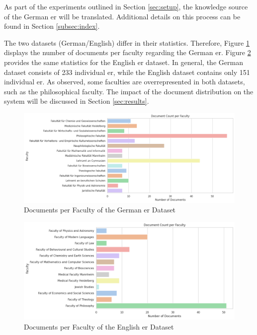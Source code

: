 As part of the experiments outlined in Section \ref{sec:setup}, the knowledge source of the German \gls{er} will be translated. Additional details on this process can be found in Section \ref{subsec:index}.

The two datasets (German/English) differ in their statistics. Therefore, Figure \ref{fig:er-german-stats} displays the number of documents per faculty regarding the German \gls{er}. Figure \ref{fig:er-english-stats} provides the same statistics for the English \gls{er} dataset. In general, the German dataset consists of 233 individual \gls{er}, while the English dataset contains only 151 individual \gls{er}. As observed, some faculties are overrepresented in both datasets, such as the philosophical faculty. The impact of the document distribution on the system will be discussed in Section \ref{sec:results}.

\begin{figure}
    \centering
    \includegraphics[width=\textwidth]{Grafiken/Statistiken/PO_german_Document Count per Faculty.png}
    \caption{Documents per Faculty of the German \gls{er} Dataset}
    \label{fig:er-german-stats}
\end{figure}

\begin{figure}
    \centering
    \includegraphics[width=\textwidth]{Grafiken/Statistiken/PO_english_Document Count per Faculty.png}
    \caption{Documents per Faculty of the English \gls{er} Dataset}
    \label{fig:er-english-stats}
\end{figure}


